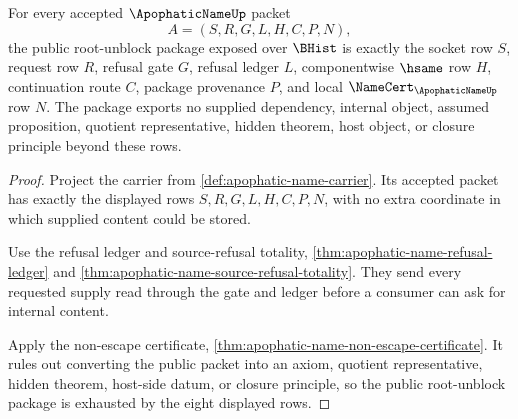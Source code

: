 \begin{theorem}\label{thm:apophatic-name-public-boundary-package}
For every accepted $\ApophaticNameUp$ packet
$$
A=(S,R,G,L,H,C,P,N),
$$
the public root-unblock package exposed over $\BHist$ is exactly the socket row $S$, request row $R$, refusal gate $G$, refusal ledger $L$, componentwise $\hsame$ row $H$, continuation route $C$, package provenance $P$, and local $\NameCert_{\ApophaticNameUp}$ row $N$. The package exports no supplied dependency, internal object, assumed proposition, quotient representative, hidden theorem, host object, or closure principle beyond these rows.
\end{theorem}
\begin{proof}
Project the carrier from \autoref{def:apophatic-name-carrier}. Its accepted packet has exactly the displayed rows $S,R,G,L,H,C,P,N$, with no extra coordinate in which supplied content could be stored.

Use the refusal ledger and source-refusal totality, \autoref{thm:apophatic-name-refusal-ledger} and \autoref{thm:apophatic-name-source-refusal-totality}. They send every requested supply read through the gate and ledger before a consumer can ask for internal content.

Apply the non-escape certificate, \autoref{thm:apophatic-name-non-escape-certificate}. It rules out converting the public packet into an axiom, quotient representative, hidden theorem, host-side datum, or closure principle, so the public root-unblock package is exhausted by the eight displayed rows.
\end{proof}

